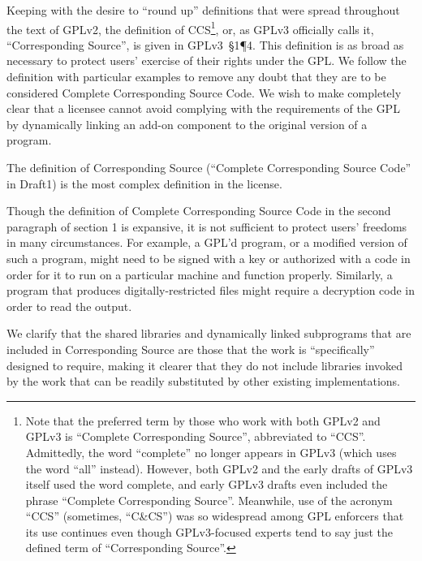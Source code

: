 Keeping with the desire to ``round up'' definitions that were spread
throughout the text of GPLv2, the definition of CCS\footnote{Note that the
  preferred term by those who work with both GPLv2 and GPLv3 is ``Complete
  Corresponding Source'', abbreviated to ``CCS''.  Admittedly, the word
  ``complete'' no longer appears in GPLv3 (which uses the word ``all''
  instead).  However, both GPLv2 and the early drafts of GPLv3 itself used
  the word complete, and early GPLv3 drafts even included the phrase
  ``Complete Corresponding Source''.  Meanwhile, use of the acronym ``CCS''
  (sometimes, ``C\&CS'') was so widespread among GPL enforcers that its use
  continues even though GPLv3-focused experts tend to say just the defined
  term of ``Corresponding Source''.}, or, as GPLv3 officially calls it,
``Corresponding Source'', is given in GPLv3~\S1\P4.  This definition is as
broad as necessary to protect users' exercise of their rights under the
GPL\@.  We follow the definition with particular examples to remove any doubt
that they are to be considered Complete Corresponding Source Code.  We wish to
make completely clear that a licensee cannot avoid complying with the
requirements of the GPL by dynamically linking an add-on component to the
original version of a program.


The definition of Corresponding Source (``Complete Corresponding Source
Code'' in Draft1) is the most complex definition in the license.


Though the definition of Complete Corresponding Source Code in the
second paragraph of section 1 is expansive, it is not sufficient to
protect users' freedoms in many circumstances.  For example, a GPL'd
program, or a modified version of such a program, might need to be
signed with a key or authorized with a code in order for it to run on
a particular machine and function properly. Similarly, a program that
produces digitally-restricted files might require a decryption code in
order to read the output.  


We clarify that the shared libraries and dynamically linked subprograms that
are included in Corresponding Source are those that the work is
``specifically'' designed to require, making it clearer that they do not
include libraries invoked by the work that can be readily substituted by
other existing implementations.


